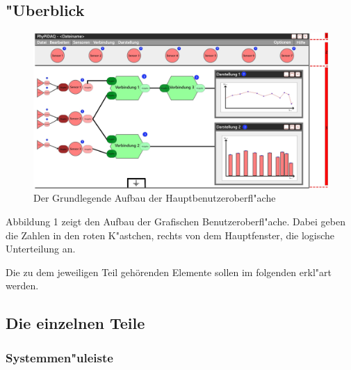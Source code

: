 \documentclass[parskip=full]{scrartcl}
\begin{document}
\subsection{"Uberblick}

\begin{figure}[h]
	\begin{center}
		\includegraphics[width = 12cm]{Grafik/GUI-mit-Segmenten.jpg}
		\caption{Der Grundlegende Aufbau der Hauptbenutzeroberfl"ache}
		\label{GUI_Grundlage}
	\end{center}
\end{figure}

Abbildung 1 zeigt den Aufbau der Grafischen Benutzeroberfl"ache. Dabei geben die Zahlen in den roten K"astchen, rechts von dem Hauptfenster, die logische Unterteilung an.

Die zu dem jeweiligen Teil gehörenden Elemente sollen im folgenden erkl"art werden.

\subsection{Die einzelnen Teile}

\subsubsection{Systemmen"uleiste}
\end{document}

